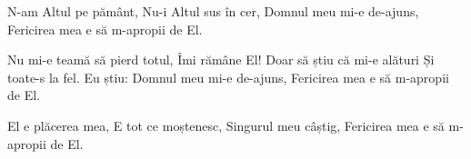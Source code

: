 \beginverse
N-am Altul pe pământ,
Nu-i Altul sus în cer,
Domnul meu mi-e de-ajuns,
Fericirea mea e să m-apropii de El.
\endverse

\beginchorus
Nu mi-e teamă să pierd totul,
Îmi rămâne El!
Doar să știu că mi-e alături
Și toate-s la fel.
Eu știu: Domnul meu mi-e de-ajuns,
Fericirea mea e să m-apropii de El.
\endchorus

\beginverse
El e plăcerea mea,
E tot ce moștenesc,
Singurul meu câștig,
Fericirea mea e să m-apropii de El.
\endverse
\endsong
